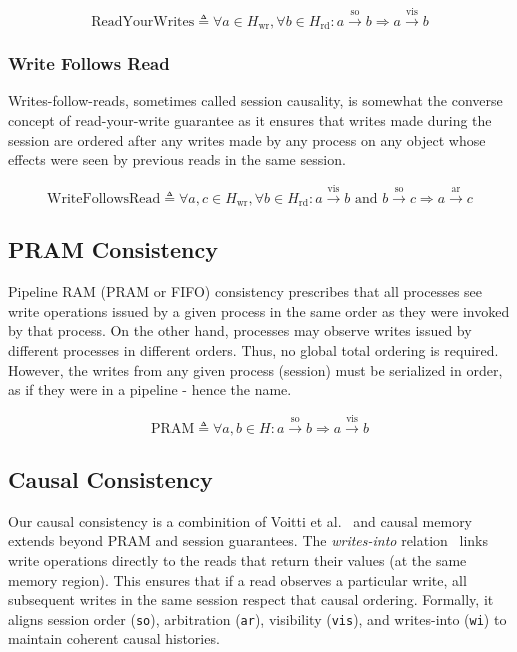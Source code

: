 $$
\text{ReadYourWrites} \triangleq \forall a \in H_\text{wr}, \forall b
\in H_\text{rd}: a \xrightarrow{\text{so}} b \Rightarrow a
\xrightarrow{\text{vis}} b
$$

\subsubsection{Write Follows Read}

Writes-follow-reads, sometimes called session causality, is somewhat the
converse concept of read-your-write guarantee as it ensures that writes made
during the session are ordered after any writes made by any process on any
object whose effects were seen by previous reads in the same session.

$$
\text{WriteFollowsRead} \triangleq \forall a, c \in H_\text{wr},
\forall b \in H_\text{rd}: a \xrightarrow{\text{vis}} b \text{ and }
b \xrightarrow{\text{so}} c \Rightarrow a \xrightarrow{\text{ar}} c
$$

\subsection{PRAM Consistency}

Pipeline RAM (PRAM or FIFO) consistency prescribes that all processes see write
operations issued by a given process in the same order as they were invoked by
that process. On the other hand, processes may observe writes issued by
different processes in different orders. Thus, no global total ordering is
required. However, the writes from any given process (session) must be
serialized in order, as if they were in a pipeline - hence the name.

$$
\text{PRAM} \triangleq \forall a, b \in H: a \xrightarrow{\text{so}}
b \Rightarrow a \xrightarrow{\text{vis}} b
$$

\subsection{Causal Consistency}

Our causal consistency is a combinition of Voitti et
al.~\cite{viotti2016consistency}
and causal memory~\cite{baldoni2002an} extends beyond PRAM and
session guarantees. The
\textit{writes-into} relation~\cite{baldoni2002an} links write
operations directly to the
reads that return their values (at the same memory region). This ensures that if
a read observes a particular write, all subsequent writes in the same session
respect that causal ordering. Formally, it aligns session order (\texttt{so}),
arbitration (\texttt{ar}), visibility (\texttt{vis}), and writes-into
(\texttt{wi}) to maintain
coherent causal histories.

